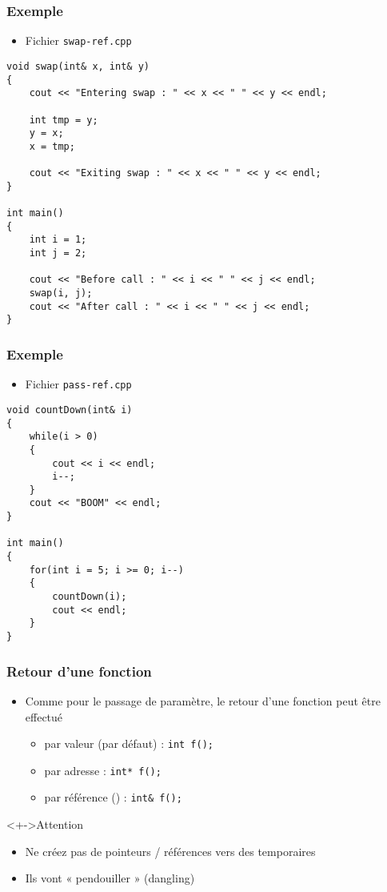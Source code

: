 \begin{frame}[containsverbatim]
\frametitle{Exemple}
\begin{itemize}[<+->]
\item Fichier \texttt{swap-ref.cpp}
\end{itemize}
\begin{lstlisting}
void swap(int& x, int& y)
{
	cout << "Entering swap : " << x << " " << y << endl;	

	int tmp = y;
	y = x;
	x = tmp;

	cout << "Exiting swap : " << x << " " << y << endl;
}

int main()
{
	int i = 1;
	int j = 2;

	cout << "Before call : " << i << " " << j << endl;
	swap(i, j);
	cout << "After call : " << i << " " << j << endl;
}
\end{lstlisting}
\end{frame}

\begin{frame}[containsverbatim]
\frametitle{Exemple}
\begin{itemize}[<+->]
\item Fichier \texttt{pass-ref.cpp}
\end{itemize}
\begin{lstlisting}
void countDown(int& i)
{
	while(i > 0)
	{
		cout << i << endl;
		i--;
	}
	cout << "BOOM" << endl;
}

int main()
{
	for(int i = 5; i >= 0; i--)
	{
		countDown(i);
		cout << endl;
	}
}
\end{lstlisting}
\end{frame}

\begin{frame}
\frametitle{Retour d'une fonction}
\begin{itemize}[<+->]
\item Comme pour le passage de paramètre, le retour d'une fonction peut être effectué
	\begin{itemize}
	\item par valeur (par défaut) : \lstinline|int f();|
	\item par adresse : \lstinline|int* f();|
	\item par référence (\cpp) : \lstinline|int& f();|
	\end{itemize}
\end{itemize}
\begin{alertblock}<+->{Attention}
	\begin{itemize}[<+->]
	\item Ne créez pas de pointeurs / références vers des temporaires
	\item Ils vont « pendouiller » (dangling)
	\end{itemize}
\end{alertblock}
\end{frame}

